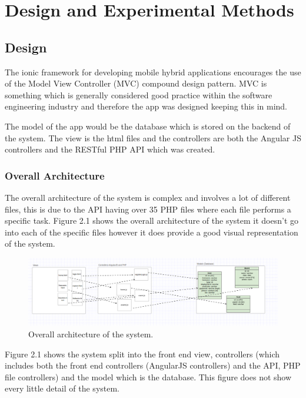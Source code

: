 \chapter{Design and Experimental Methods}
\section{Design}
The ionic framework for developing mobile hybrid applications encourages the use of the Model View Controller (MVC) compound design pattern. MVC is something which is generally considered good practice within the software engineering industry and therefore the app was designed keeping this in mind.

The model of the app would be the database which is stored on the backend of the system. The view is the html files and the controllers are both the Angular JS controllers and the RESTful PHP API which was created.

\subsection{Overall Architecture}
The overall architecture of the system is complex and involves a lot of different files, this is due to the API having over 35 PHP files where each file performs a specific task. Figure 2.1 shows the overall architecture of the system it doesn't go into each of the specific files however it does provide a good visual representation of the system.

\begin{figure}[H]
\includegraphics[width=\textwidth,height=\textheight,keepaspectratio]{images/overall}
\caption{Overall architecture of the system.}
\end{figure}

Figure 2.1 shows the system split into the front end view, controllers (which includes both the front end controllers (AngularJS controllers) and the API, PHP file controllers) and the model which is the database. This figure does not show every little detail of the system.

